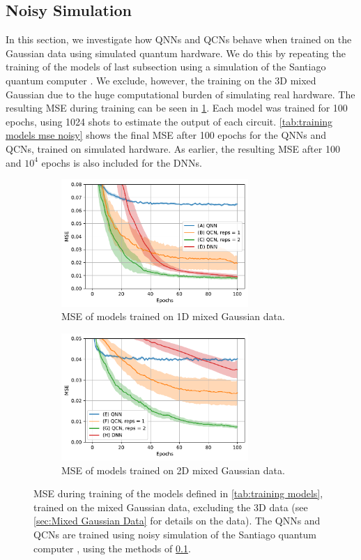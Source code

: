 \subsection{Noisy Simulation}\label{sec:Noisy Simulation}
In this section, we investigate how QNNs and QCNs behave when trained on the Gaussian data using simulated quantum hardware. We do this by repeating the training of the models of last subsection using a simulation of the Santiago quantum computer \cite{santiago}. We exclude, however, the training on the 3D mixed Gaussian due to the huge computational burden of simulating real hardware. The resulting MSE during training can be seen in \cref{fig:trained noisy}. Each model was trained for 100 epochs, using 1024 shots to estimate the output of each circuit. \cref{tab:training models mse noisy} shows the final MSE after 100 epochs for the QNNs and QCNs, trained on simulated hardware. As earlier, the resulting MSE after 100 and $10^{4}$ epochs is also included for the DNNs.


\begin{figure}[H]
    \centering
    \begin{subfigure}[t]{0.45\textwidth}
        \centering
        \includegraphics[height=1.9in]{latex/figures/1D_gaussian_data_fit_noisy.pdf}
        \caption{MSE of models trained on 1D mixed Gaussian data.}
        
    \end{subfigure}%
    \hfill 
    \begin{subfigure}[t]{0.45\textwidth}
        \centering
        \includegraphics[height=1.9in]{latex/figures/2D_gaussian_data_fit_noisy.pdf}
        \caption{MSE of models trained on 2D mixed Gaussian data.}
    \end{subfigure}
    \caption{MSE during training of the models defined in \cref{tab:training models}, trained on the mixed Gaussian data, excluding the 3D data (see \cref{sec:Mixed Gaussian Data} for details on the data). The QNNs and QCNs are trained using noisy simulation of the Santiago quantum computer \cite{santiago}, using the methods of \cref{sec:Noisy Simulation}.}
    \label{fig:trained noisy}
\end{figure}


